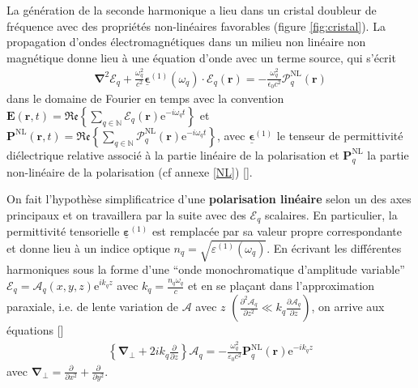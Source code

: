 \documentclass[11pt,a4paper] { article}
\newcommand{\ncite}[1]{[\citenum{#1}]}
\newcommand{\pdv}[2]{\frac{\partial #1}{\partial #2}}
\newcommand{\E}{\mathcal{E}}
\newcommand{\A}{\mathcal{A}}
\newcommand{\e}[1]{\text{e}^{#1}}
\newcommand{\mathsc}[1]{\mathrm{\scriptscriptstyle {#1}}}
\renewcommand{\v}[1]{\boldsymbol{\mathbf{#1}}}
\newcommand{\tens}[1]{\boldsymbol{\underline{#1}}}
\begin{document}
La génération de la seconde harmonique a lieu dans un cristal doubleur de fréquence avec des propriétés non-linéaires favorables (figure \ref{fig:cristal}).
La propagation d'ondes électromagnétiques dans un milieu non linéaire non magnétique donne lieu à une équation d'onde avec un terme source, qui s'écrit 
\begin{align}
\boldsymbol{\nabla}^2 \boldsymbol{\E}_q + \frac{\omega_q^2}{c^2}\tens\epsilon^{(1)}(\omega_q)\cdot \v \E_q(\v r) = - \frac{\omega_q^2}{\epsilon_0 c^2} \boldsymbol{\mathcal{P}}^\mathsc{NL}_q(\v r)
\end{align}
dans le domaine de Fourier en temps avec la convention $\v E(\v r, t) = \mathfrak{Re} \left\{ \sum_{q \in \mathbb N} \v {\boldsymbol{\mathcal E}}_q (\v r) \e{-i \omega_q t} \right\}$ et $\v P^\mathsc{NL} (\v r, t) = \mathfrak{Re} \left\{ \sum_{q \in \mathbb N} \v {\boldsymbol{\mathcal P}}^\mathsc{NL}_q (\v r) \e{-i \omega_q t} \right\}
$,
avec $\tens \epsilon^{(1)}$ le tenseur de permittivité diélectrique relative associé à la partie linéaire de la polarisation et $\v P^\mathsc{NL}_q$ la partie non-linéaire de la polarisation (cf annexe \ref{NL}) \ncite{boyd,joffre}.

On fait l'hypothèse simplificatrice d'une \textbf{polarisation linéaire} selon un des axes principaux et on travaillera par la suite avec des $\mathcal E_q$ scalaires. En particulier, la permittivité tensorielle $\tens \varepsilon^{(1)}$ est remplacée par sa valeur propre correspondante et donne lieu à un indice optique $\boxed{ n_q = \sqrt{ \varepsilon^{(1)}(\omega_q)}}$. En écrivant les différentes harmoniques sous la forme d'une ``onde monochromatique d'amplitude variable'' $\mathcal E_q = \A_q(x,y,z) \e{ik_qz}$ avec $\boxed{k_q =\frac{n_q \omega_q}{c}}$ et en se plaçant dans l'approximation paraxiale, i.e. de lente variation de $\A$ avec $z$ $\left(\frac{\partial^2 \A_q}{\partial z^2} \ll k_q \frac{\partial \A_q}{\partial z}\right)$, on arrive aux équations \ncite{joffre}
\begin{align}  
	\left\{\v\nabla_\bot + 2 i k_q \frac{\partial}{\partial z} \right\} \A_q = - \frac{\omega_q^2}{\varepsilon_0 c^2} \v P^\mathsc{NL}_q (\v r) \e{-ik_qz}
	\label{eq:parax}
\end{align}
avec $\v\nabla_\bot = \pdv{}{x^2} + \pdv{}{y^2}$.
\end{document}
